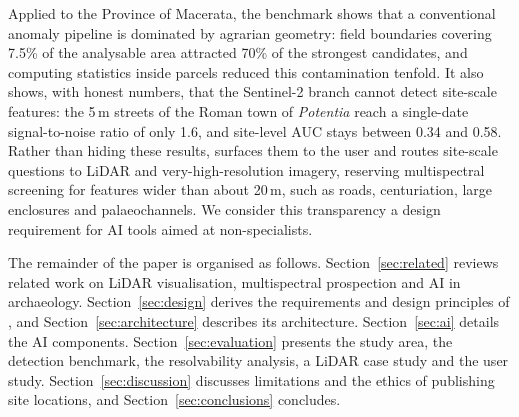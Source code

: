 Applied to the Province of Macerata, the benchmark shows that a conventional anomaly pipeline is dominated by agrarian geometry: field boundaries covering 7.5\% of the analysable area attracted 70\% of the strongest candidates, and computing statistics inside parcels reduced this contamination tenfold. It also shows, with honest numbers, that the Sentinel-2 branch cannot detect site-scale features: the 5\,m streets of the Roman town of \textit{Potentia} reach a single-date signal-to-noise ratio of only 1.6, and site-level AUC stays between 0.34 and 0.58. Rather than hiding these results, \airch{} surfaces them to the user and routes site-scale questions to LiDAR and very-high-resolution imagery, reserving multispectral screening for features wider than about 20\,m, such as roads, centuriation, large enclosures and palaeochannels. We consider this transparency a design requirement for AI tools aimed at non-specialists.

The remainder of the paper is organised as follows. Section~\ref{sec:related} reviews related work on LiDAR visualisation, multispectral prospection and AI in archaeology. Section~\ref{sec:design} derives the requirements and design principles of \airch{}, and Section~\ref{sec:architecture} describes its architecture. Section~\ref{sec:ai} details the AI components. Section~\ref{sec:evaluation} presents the study area, the detection benchmark, the resolvability analysis, a LiDAR case study and the user study. Section~\ref{sec:discussion} discusses limitations and the ethics of publishing site locations, and Section~\ref{sec:conclusions} concludes.
